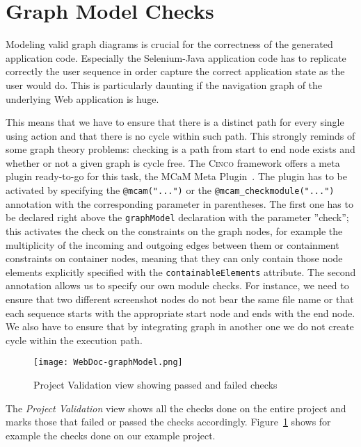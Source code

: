 \section{Graph Model Checks}\label{sec:modCheck}

Modeling valid graph diagrams is crucial for the correctness of the generated application code. Especially the Selenium-Java application code has to replicate correctly the user sequence in order capture the correct application state as the user would do. This is particularly daunting if the navigation graph of the underlying Web application is huge.

This means that we have to ensure that there is a distinct path for every single using action and that there is no cycle within such path. This strongly reminds of some graph theory problems: checking is a path from start to end node exists and whether or not a given graph is cycle free. The \textsc{Cinco} framework offers a meta plugin ready-to-go for this task, the MCaM Meta Plugin~\cite{gitlabcinco}. The plugin has to be activated by specifying the \lstinline{@mcam("...")} or the \lstinline{@mcam_checkmodule("...")} annotation with the corresponding parameter in parentheses. The first one has to be declared right above the \lstinline[language=MGL]{graphModel} declaration with the parameter ''check''; this activates the check on the constraints on the graph nodes, for example the multiplicity of the incoming and outgoing edges between them or containment constraints on container nodes, meaning that they can only contain those node elements explicitly specified with the \lstinline[language=MGL]{containableElements} attribute. The second annotation allows us to specify our own module checks. For instance, we need to ensure that two different screenshot nodes do not bear the same file name or that each sequence starts with the appropriate start node and ends with the end node. We also have to ensure that by integrating graph in another one we do not create cycle within the execution path. 

\begin{figure}[h]
    \centering
    \texttt{[image: WebDoc-graphModel.png]}
    \caption{Project Validation view showing passed and failed checks}
    \label{fig:modelChecks}
\end{figure}

The \textit{Project Validation} view shows all the checks done on the entire project and marks those that failed or passed the checks accordingly. Figure~\ref{fig:modelChecks} shows for example the checks done on our example project.

